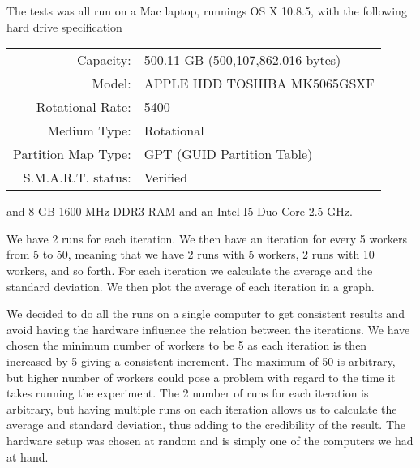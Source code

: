 \documentclass[a4paper, 11pt]{article}
\begin{document}
The tests was all run on a Mac laptop, runnings OS X 10.8.5, with the following hard drive specification

\begin{table}[H]
\begin{tabular}{rl}
Capacity:           & 500.11 GB (500,107,862,016 bytes) \\ 
Model:              & APPLE HDD TOSHIBA MK5065GSXF      \\   
Rotational Rate:    & 5400                              \\   
Medium Type:        & Rotational                        \\   
Partition Map Type: & GPT (GUID Partition Table)        \\   
S.M.A.R.T. status:  & Verified                             
\end{tabular}
\end{table}

and 8 GB 1600 MHz DDR3 RAM and an Intel I5 Duo Core 2.5 GHz.

We have 2 runs for each iteration. We then have an iteration for every 5 workers from 5 to 50, meaning that we have 2 runs with 5 workers, 2 runs with 10 workers, and so forth. For each iteration we calculate the average and the standard deviation. We then plot the average of each iteration in a graph.

We decided to do all the runs on a single computer to get consistent results and avoid having the hardware influence the relation between the iterations. We have chosen the minimum number of workers to be 5 as each iteration is then increased by 5 giving a consistent increment. The maximum of 50 is arbitrary, but higher number of workers could pose a problem with regard to the time it takes running the experiment. The 2 number of runs for each iteration is arbitrary, but having multiple runs on each iteration allows us to calculate the average and standard deviation, thus adding to the credibility of the result. The hardware setup was chosen at random and is simply one of the computers we had at hand.


\subsection{} %




\end{document}
